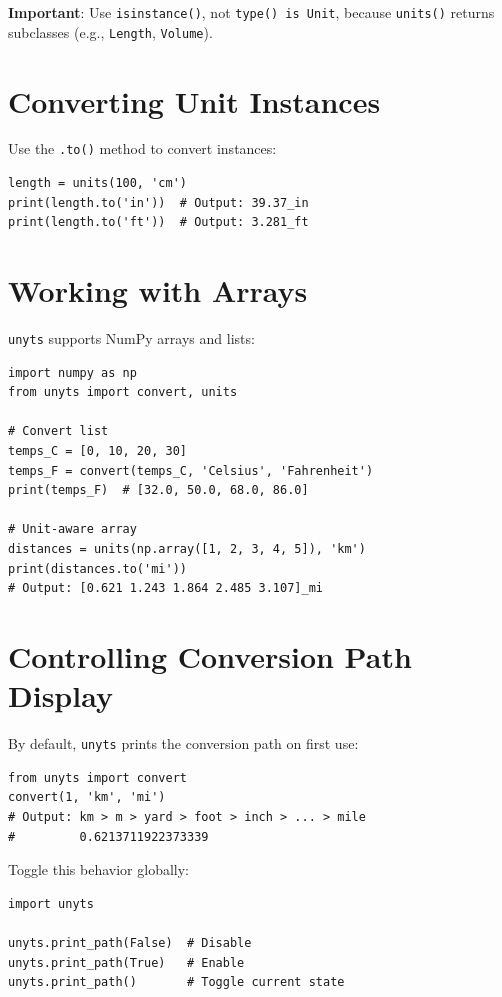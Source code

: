 \documentclass[11pt,a4paper]{report}
\begin{document}
\textbf{Important}: Use \texttt{isinstance()}, not \texttt{type() is Unit}, because \texttt{units()} returns subclasses (e.g., \texttt{Length}, \texttt{Volume}).

\section{Converting Unit Instances}

Use the \texttt{.to()} method to convert instances:

\begin{lstlisting}[style=pythonstyle]
length = units(100, 'cm')
print(length.to('in'))  # Output: 39.37_in
print(length.to('ft'))  # Output: 3.281_ft
\end{lstlisting}

\section{Working with Arrays}

\texttt{unyts} supports NumPy arrays and lists:

\begin{lstlisting}[style=pythonstyle]
import numpy as np
from unyts import convert, units

# Convert list
temps_C = [0, 10, 20, 30]
temps_F = convert(temps_C, 'Celsius', 'Fahrenheit')
print(temps_F)  # [32.0, 50.0, 68.0, 86.0]

# Unit-aware array
distances = units(np.array([1, 2, 3, 4, 5]), 'km')
print(distances.to('mi'))  
# Output: [0.621 1.243 1.864 2.485 3.107]_mi
\end{lstlisting}

\section{Controlling Conversion Path Display}

By default, \texttt{unyts} prints the conversion path on first use:

\begin{lstlisting}[style=pythonstyle]
from unyts import convert
convert(1, 'km', 'mi')
# Output: km > m > yard > foot > inch > ... > mile
#         0.6213711922373339
\end{lstlisting}

Toggle this behavior globally:

\begin{lstlisting}[style=pythonstyle]
import unyts

unyts.print_path(False)  # Disable
unyts.print_path(True)   # Enable
unyts.print_path()       # Toggle current state
\end{lstlisting}
\end{document}
